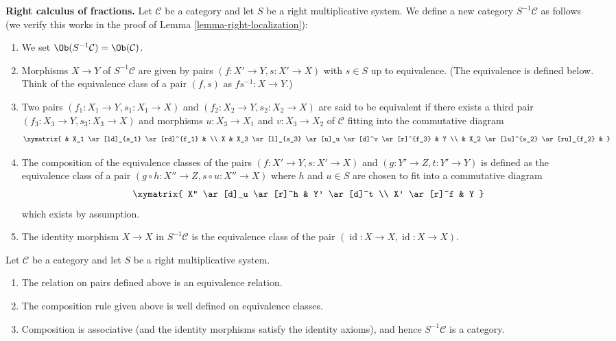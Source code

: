 \noindent
{\bf Right calculus of fractions.}
Let $\mathcal{C}$ be a category and let $S$ be a right multiplicative
system. We define a new category $S^{-1}\mathcal{C}$ as follows
(we verify this works in the proof of
Lemma \ref{lemma-right-localization}):
\begin{enumerate}
\item We set $\Ob(S^{-1}\mathcal{C}) = \Ob(\mathcal{C})$.
\item Morphisms $X \to Y$ of $S^{-1}\mathcal{C}$ are given by pairs
$(f : X' \to Y, s : X' \to X)$ with $s \in S$ up to equivalence.
(The equivalence is defined below. Think of the equivalence class
of a pair $(f, s)$ as $fs^{-1} : X \to Y$.)
\item Two pairs $(f_1 : X_1 \to Y, s_1 : X_1 \to X)$ and
$(f_2 : X_2 \to Y, s_2 : X_2 \to X)$ are said to be equivalent
if there exists a third pair $(f_3 : X_3 \to Y, s_3 : X_3 \to X)$
and morphisms $u : X_3 \to X_1$ and $v : X_3 \to X_2$ of $\mathcal{C}$
fitting into the commutative diagram
$$
\xymatrix{
 & X_1 \ar[ld]_{s_1} \ar[rd]^{f_1} & \\
X &
X_3 \ar[l]_{s_3} \ar[u]_u \ar[d]^v \ar[r]^{f_3} &
Y \\
& X_2 \ar[lu]^{s_2} \ar[ru]_{f_2} &
}
$$
\item The composition of the equivalence classes of the pairs
$(f : X' \to Y, s : X' \to X)$ and $(g : Y' \to Z, t : Y' \to Y)$
is defined as the equivalence class of a pair
$(g \circ h : X'' \to Z, s \circ u : X'' \to X)$
where $h$ and $u \in S$ are chosen to fit into a commutative diagram
$$
\xymatrix{
X'' \ar[d]_u \ar[r]^h & Y' \ar[d]^t \\
X' \ar[r]^f & Y
}
$$
which exists by assumption.
\item The identity morphism $X \to X$ in $S^{-1} \mathcal{C}$ is the
equivalence class of the pair $(\operatorname{id} : X \to X,
\operatorname{id} : X \to X)$.
\end{enumerate}

\begin{lemma}
\label{lemma-right-localization}
Let $\mathcal{C}$ be a category and let $S$ be a right multiplicative
system.
\begin{enumerate}
\item The relation on pairs defined above is an equivalence relation.
\item The composition rule given above is well defined on equivalence
classes.
\item Composition is associative (and the identity morphisms satisfy
the identity axioms), and hence $S^{-1}\mathcal{C}$ is a category.
\end{enumerate}
\end{lemma}

